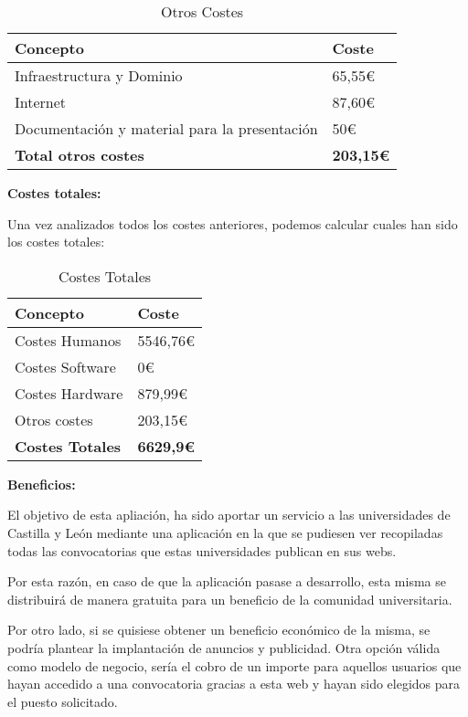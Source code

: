 \begin{table}[H]
    \centering
    \setlength{\tabcolsep}{20pt}
    \begin{tabular}{l l}
        \hline
        \textbf{Concepto} & \textbf{Coste} \\ \hline
        Infraestructura y Dominio & 65,55€ \\
        Internet  & 87,60€\\
        Documentación y material para la presentación & 50€\\  \hline
        \textbf{Total otros costes} & \textbf{203,15€}\\ \hline
    \end{tabular}
    \caption{Otros Costes}
    \label{tab:otros_costes}
\end{table}


\textbf{Costes totales:}

Una vez analizados todos los costes anteriores, podemos calcular cuales han sido los costes totales:

\begin{table}[H]
    \centering
    \renewcommand{\arraystretch}{1.2}
    \setlength{\tabcolsep}{20pt}
    \begin{tabular}{l l}
        \hline
        \textbf{Concepto} & \textbf{Coste} \\ \hline
        Costes Humanos & 5546,76€ \\
        Costes Software & 0€ \\
        Costes Hardware  & 879,99€\\
        Otros costes & 203,15€\\  \hline
        \textbf{Costes Totales} & \textbf{6629,9€}\\ \hline
    \end{tabular}
    \caption{Costes Totales}
    \label{tab:costes_totales}
\end{table}

\textbf{Beneficios:}

El objetivo de esta apliación, ha sido aportar un servicio a las universidades de Castilla y León mediante una aplicación en la que se pudiesen ver recopiladas todas las convocatorias que estas universidades publican en sus webs. 

Por esta razón, en caso de que la aplicación pasase a desarrollo, esta misma se distribuirá de manera gratuita para un beneficio de la comunidad universitaria.

Por otro lado, si se quisiese obtener un beneficio económico de la misma, se podría plantear la implantación de anuncios y publicidad. Otra opción válida como modelo de negocio, sería el cobro de un importe para aquellos usuarios que hayan accedido a una convocatoria gracias a esta web y hayan sido elegidos para el puesto solicitado.

